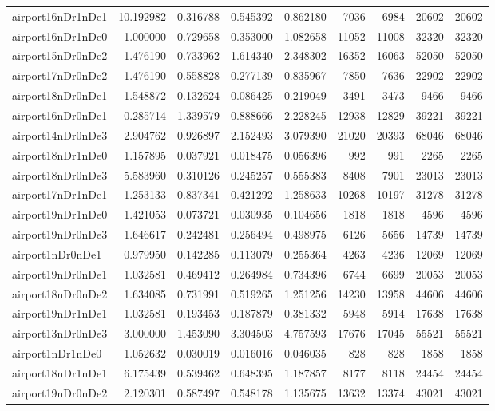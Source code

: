 \begin{longtable}{|l|r|r|r|r|r|r|r|r|}
airport16nDr1nDe1 & 10.192982 & 0.316788 & 0.545392 & 0.862180 & 7036 & 6984 & 20602 & 20602 \\
airport16nDr1nDe0 & 1.000000 & 0.729658 & 0.353000 & 1.082658 & 11052 & 11008 & 32320 & 32320 \\
airport15nDr0nDe2 & 1.476190 & 0.733962 & 1.614340 & 2.348302 & 16352 & 16063 & 52050 & 52050 \\
airport17nDr0nDe2 & 1.476190 & 0.558828 & 0.277139 & 0.835967 & 7850 & 7636 & 22902 & 22902 \\
airport18nDr0nDe1 & 1.548872 & 0.132624 & 0.086425 & 0.219049 & 3491 & 3473 & 9466 & 9466 \\
airport16nDr0nDe1 & 0.285714 & 1.339579 & 0.888666 & 2.228245 & 12938 & 12829 & 39221 & 39221 \\
airport14nDr0nDe3 & 2.904762 & 0.926897 & 2.152493 & 3.079390 & 21020 & 20393 & 68046 & 68046 \\
airport18nDr1nDe0 & 1.157895 & 0.037921 & 0.018475 & 0.056396 & 992 & 991 & 2265 & 2265 \\
airport18nDr0nDe3 & 5.583960 & 0.310126 & 0.245257 & 0.555383 & 8408 & 7901 & 23013 & 23013 \\
airport17nDr1nDe1 & 1.253133 & 0.837341 & 0.421292 & 1.258633 & 10268 & 10197 & 31278 & 31278 \\
airport19nDr1nDe0 & 1.421053 & 0.073721 & 0.030935 & 0.104656 & 1818 & 1818 & 4596 & 4596 \\
airport19nDr0nDe3 & 1.646617 & 0.242481 & 0.256494 & 0.498975 & 6126 & 5656 & 14739 & 14739 \\
airport1nDr0nDe1 & 0.979950 & 0.142285 & 0.113079 & 0.255364 & 4263 & 4236 & 12069 & 12069 \\
airport19nDr0nDe1 & 1.032581 & 0.469412 & 0.264984 & 0.734396 & 6744 & 6699 & 20053 & 20053 \\
airport18nDr0nDe2 & 1.634085 & 0.731991 & 0.519265 & 1.251256 & 14230 & 13958 & 44606 & 44606 \\
airport19nDr1nDe1 & 1.032581 & 0.193453 & 0.187879 & 0.381332 & 5948 & 5914 & 17638 & 17638 \\
airport13nDr0nDe3 & 3.000000 & 1.453090 & 3.304503 & 4.757593 & 17676 & 17045 & 55521 & 55521 \\
airport1nDr1nDe0 & 1.052632 & 0.030019 & 0.016016 & 0.046035 & 828 & 828 & 1858 & 1858 \\
airport18nDr1nDe1 & 6.175439 & 0.539462 & 0.648395 & 1.187857 & 8177 & 8118 & 24454 & 24454 \\
airport19nDr0nDe2 & 2.120301 & 0.587497 & 0.548178 & 1.135675 & 13632 & 13374 & 43021 & 43021 \\

\end{longtable}

